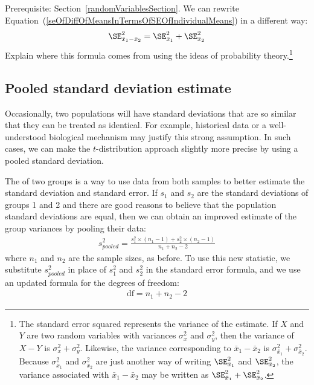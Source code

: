 {\begin{exercise}\label{derivingSEForDiffOfTwoMeansExercise}
	Prerequisite: Section~\ref{randomVariablesSection}.
	We can rewrite Equation~(\ref{seOfDiffOfMeansInTermsOfSEOfIndividualMeans}) in a different way:
	\begin{eqnarray*}
	\SE_{\bar{x}_{1} - \bar{x}_{2}}^2 = \SE_{\bar{x}_1}^2 + \SE_{\bar{x}_2}^2
	\end{eqnarray*}
	Explain where this formula comes from using the ideas of probability theory.\footnote{The standard error squared represents the variance of the estimate. If $X$ and $Y$ are two random variables with variances $\sigma_x^2$ and $\sigma_y^2$, then the variance of $X-Y$ is $\sigma_x^2 + \sigma_y^2$. Likewise, the variance corresponding to $\bar{x}_1 - \bar{x}_2$ is $\sigma_{\bar{x}_1}^2 + \sigma_{\bar{x}_2}^2$. Because $\sigma_{\bar{x}_1}^2$ and $\sigma_{\bar{x}_2}^2$ are just another way of writing $\SE_{\bar{x}_1}^2$ and  $\SE_{\bar{x}_2}^2$, the variance associated with $\bar{x}_1 - \bar{x}_2$ may be written as $\SE_{\bar{x}_1}^2 + \SE_{\bar{x}_2}^2$.}
\end{exercise}


\subsection{Pooled standard deviation estimate}
\label{pooledStandardDeviations}

Occasionally, two populations will have standard deviations that are so similar that they can be treated as identical. For example, historical data or a well-understood biological mechanism may justify this strong assumption. In such cases, we can make the $t$-distribution approach slightly more precise by using a pooled standard deviation.

The  of two groups is a way to use data from both samples to better estimate the standard deviation and standard error. If $s_1^{}$ and $s_2^{}$ are the standard deviations of groups 1 and 2 and there are good reasons to believe that the population standard deviations are equal, then we can obtain an improved estimate of the group variances by pooling their data:
\begin{align*}
s_{pooled}^2 = \frac{s_1^2\times (n_1-1) + s_2^2\times (n_2-1)}{n_1 + n_2 - 2}
\end{align*}
where $n_1$ and $n_2$ are the sample sizes, as before. To use this new statistic, we substitute $s_{pooled}^2$ in place of $s_1^2$ and $s_2^2$ in the standard error formula, and we use an updated formula for the degrees of freedom:
\begin{align*}
\text{df} = n_1 + n_2 - 2
\end{align*}

}
